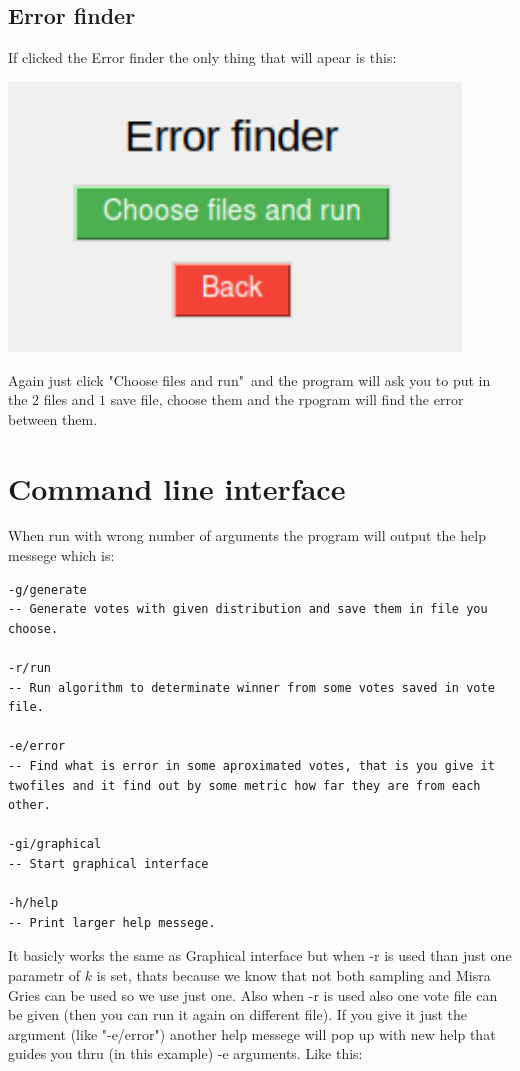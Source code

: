 \documentclass[a4paper,12pt]{report}
\begin{document}
	\section{Error finder}
	
	If clicked the Error finder the only thing that will apear is this:
	
	\begin{center}
		\includegraphics[width=12cm]{error_finder.png}
	\end{center}
	
	Again just click "Choose files and run"\ and the program will ask you to put in the $2$ files and $1$ save file, choose them and the rpogram will find the error between them.
	
	\chapter{Command line interface}
	
	When run with wrong number of arguments the program will output the help messege which is:
	
	\begin{lstlisting}
-g/generate
-- Generate votes with given distribution and save them in file you choose.

-r/run
-- Run algorithm to determinate winner from some votes saved in vote file.

-e/error
-- Find what is error in some aproximated votes, that is you give it twofiles and it find out by some metric how far they are from each other.

-gi/graphical
-- Start graphical interface

-h/help
-- Print larger help messege.
	\end{lstlisting}
	
	It basicly works the same as Graphical interface but when -r is used than just one parametr of $k$ is set, thats because we know that not both sampling and Misra Gries can be used so we use just one. Also when -r is used also one vote file can be given (then you can run it again on different file). If you give it just the argument (like "-e/error") another help messege will pop up with new help that guides you thru (in this example) -e arguments. Like this:
	
\end{document}
